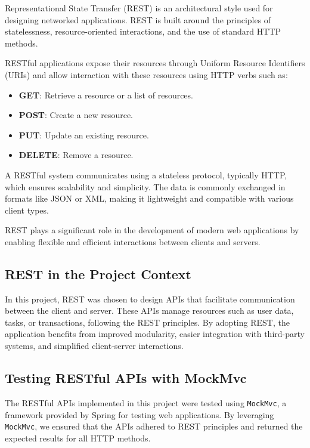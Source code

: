 \documentclass[a4paper,12pt]{article}
\begin{document}
Representational State Transfer (REST) is an architectural style used for designing networked applications. REST is built around the principles of statelessness, resource-oriented interactions, and the use of standard HTTP methods.

RESTful applications expose their resources through Uniform Resource Identifiers (URIs) and allow interaction with these resources using HTTP verbs such as:
\begin{itemize}
    \item \textbf{GET}: Retrieve a resource or a list of resources.
    \item \textbf{POST}: Create a new resource.
    \item \textbf{PUT}: Update an existing resource.
    \item \textbf{DELETE}: Remove a resource.
\end{itemize}

A RESTful system communicates using a stateless protocol, typically HTTP, which ensures scalability and simplicity. The data is commonly exchanged in formats like JSON or XML, making it lightweight and compatible with various client types.

REST plays a significant role in the development of modern web applications by enabling flexible and efficient interactions between clients and servers.

\subsection{REST in the Project Context}

In this project, REST was chosen to design APIs that facilitate communication between the client and server. These APIs manage resources such as user data, tasks, or transactions, following the REST principles. By adopting REST, the application benefits from improved modularity, easier integration with third-party systems, and simplified client-server interactions.
\subsection{Testing RESTful APIs with MockMvc}

The RESTful APIs implemented in this project were tested using \texttt{MockMvc}, a framework provided by Spring for testing web applications. By leveraging \texttt{MockMvc}, we ensured that the APIs adhered to REST principles and returned the expected results for all HTTP methods.
\end{document}
